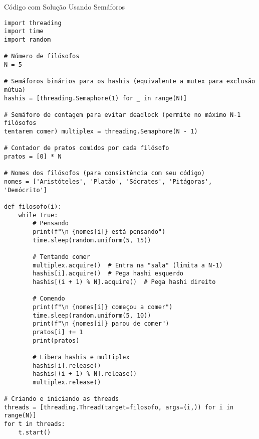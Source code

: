 Código com Solução Usando Semáforos

\begin{verbatim}
import threading
import time
import random

# Número de filósofos
N = 5

# Semáforos binários para os hashis (equivalente a mutex para exclusão mútua)
hashis = [threading.Semaphore(1) for _ in range(N)]

# Semáforo de contagem para evitar deadlock (permite no máximo N-1 filósofos 
tentarem comer) multiplex = threading.Semaphore(N - 1)

# Contador de pratos comidos por cada filósofo
pratos = [0] * N

# Nomes dos filósofos (para consistência com seu código)
nomes = ['Aristóteles', 'Platão', 'Sócrates', 'Pitágoras', 'Demócrito']

def filosofo(i):
    while True:
        # Pensando
        print(f"\n {nomes[i]} está pensando")
        time.sleep(random.uniform(5, 15))
        
        # Tentando comer
        multiplex.acquire()  # Entra na "sala" (limita a N-1)
        hashis[i].acquire()  # Pega hashi esquerdo
        hashis[(i + 1) % N].acquire()  # Pega hashi direito
        
        # Comendo
        print(f"\n {nomes[i]} começou a comer")
        time.sleep(random.uniform(5, 10))
        print(f"\n {nomes[i]} parou de comer")
        pratos[i] += 1
        print(pratos)
        
        # Libera hashis e multiplex
        hashis[i].release()
        hashis[(i + 1) % N].release()
        multiplex.release()

# Criando e iniciando as threads
threads = [threading.Thread(target=filosofo, args=(i,)) for i in range(N)]
for t in threads:
    t.start()
    
\end{verbatim}
